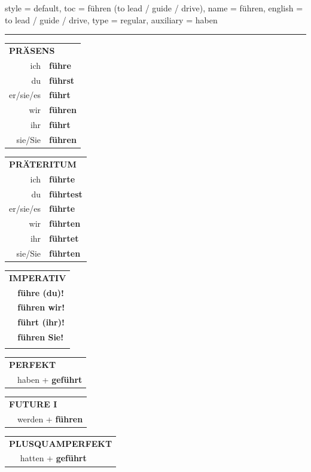\begin{verbentry}{
  style = {default},
  toc = {führen (to lead / guide / drive)},
  name = {führen},
  english = {to lead / guide / drive},
  type = {regular},
  auxiliary = {haben}
}
 
    
     \vspace{5pt}

    \hrule
    
    \vspace{5pt}

  \begin{tabular}{rl}
     \multicolumn{2}{l}{\textbf{PRÄSENS} }\\
    ich & \textbf{führe}\\
    du & \textbf{führst}\\
    er/sie/es & \textbf{führt}\\
    wir & \textbf{führen}\\
    ihr & \textbf{führt}\\
    sie/Sie & \textbf{führen}\\
  \end{tabular}
  \hfill
  \begin{tabular}{rl}
    \multicolumn{2}{l}{\textbf{PRÄTERITUM} }\\
    ich & \textbf{führte}\\
    du & \textbf{führtest}\\
    er/sie/es & \textbf{führte}\\
    wir & \textbf{führten}\\
    ihr & \textbf{führtet}\\
    sie/Sie & \textbf{führten}\\
  \end{tabular}
  \hfill
  \begin{tabular}{rl}
     \multicolumn{2}{l}{\textbf{IMPERATIV} }\\
   & \textbf{führe (du)!}\\
   & \textbf{führen wir!}\\
   & \textbf{führt (ihr)!}\\
   & \textbf{führen Sie!}\\
   & \vspace{10pt}
  \end{tabular}

 \vspace{10pt}

 \begin{tabular}{rl}
     \multicolumn{2}{l}{\textbf{PERFEKT}}\\
   & haben + \textbf{geführt}\\
  \end{tabular}
\hfill
\begin{tabular}{rl}
    \multicolumn{2}{l}{\textbf{FUTURE I}}\\
   & werden + \textbf{führen}\\
  \end{tabular}
\hfill
\begin{tabular}{rl}
    \multicolumn{2}{l}{\textbf{PLUSQUAMPERFEKT}}\\
   & hatten + \textbf{geführt}\\
  \end{tabular}


\end{verbentry}
